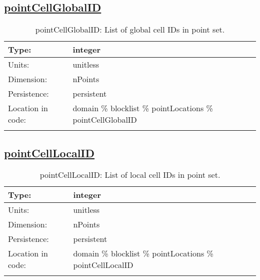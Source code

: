 \subsection[pointCellGlobalID]{\hyperref[sec:var_tab_pointLocations]{pointCellGlobalID}}
\label{subsec:var_sec_pointLocations_pointCellGlobalID}
\begin{center}
\begin{longtable}{| p{2.0in} | p{4.0in} |}
        \hline 
        Type: & integer \\
        \hline 
        Units: & \si{unitless} \\
        \hline 
        Dimension: & nPoints \\
        \hline 
        Persistence: & persistent \\
        \hline 
         Location in code: & domain \% blocklist \% pointLocations \% pointCellGlobalID \\
         \hline 
    \caption{pointCellGlobalID: List of global cell IDs in point set.}
\end{longtable}
\end{center}
\subsection[pointCellLocalID]{\hyperref[sec:var_tab_pointLocations]{pointCellLocalID}}
\label{subsec:var_sec_pointLocations_pointCellLocalID}
\begin{center}
\begin{longtable}{| p{2.0in} | p{4.0in} |}
        \hline 
        Type: & integer \\
        \hline 
        Units: & \si{unitless} \\
        \hline 
        Dimension: & nPoints \\
        \hline 
        Persistence: & persistent \\
        \hline 
         Location in code: & domain \% blocklist \% pointLocations \% pointCellLocalID \\
         \hline 
    \caption{pointCellLocalID: List of local cell IDs in point set.}
\end{longtable}
\end{center}

